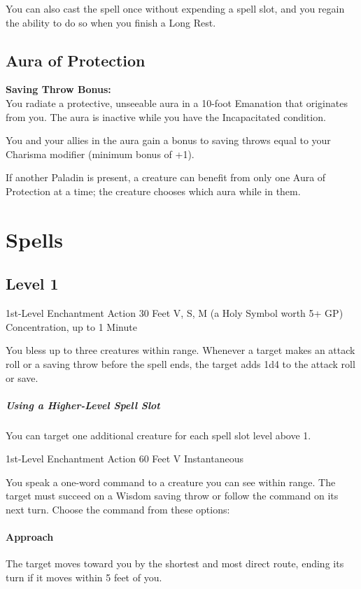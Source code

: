 \documentclass[letterpaper,openany,oneside,twocolumn]{book}
\begin{document}
You can also cast the spell once without expending a spell slot, and you regain the ability to do so when you finish a Long Rest.
\subsection*{Aura of Protection}
\textbf{Saving Throw Bonus: \calculateModifier{\CharismaScoreValue}}\\
You radiate a protective, unseeable aura in a 10-foot Emanation that originates from you. The aura is inactive while you have the Incapacitated condition.

You and your allies in the aura gain a bonus to saving throws equal to your Charisma modifier (minimum bonus of +1).

If another Paladin is present, a creature can benefit from only one Aura of Protection at a time; the creature chooses which aura while in them.

\section*{Spells}
\subsection*{Level 1}

	{1st-Level Enchantment}
	{Action}
	{30 Feet}
	{V, S, M (a Holy Symbol worth 5+ GP)}
	{Concentration, up to 1 Minute}

You bless up to three creatures within range. Whenever a target makes an attack roll or a saving throw before the spell ends, the target adds 1d4 to the attack roll or save.

\subparagraph*{Using a Higher-Level Spell Slot} You can target one additional creature for each spell slot level above 1.

	{1st-Level Enchantment}
	{Action}
	{60 Feet}
	{V}
	{Instantaneous}

You speak a one-word command to a creature you can see within range. The target must succeed on a Wisdom saving throw or follow the command on its next turn. Choose the command from these options:

\paragraph*{Approach} The target moves toward you by the shortest and most direct route, ending its turn if it moves within 5 feet of you.
\end{document}
